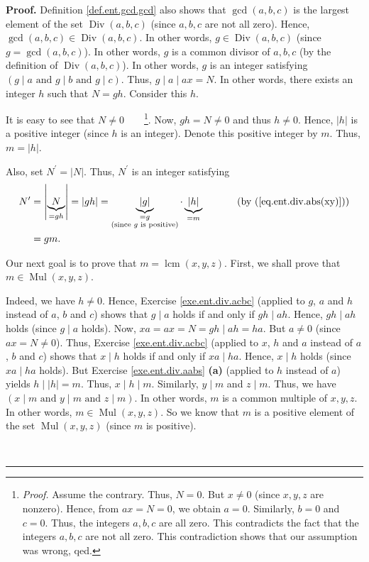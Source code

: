 \documentclass[numbers=enddot,12pt,final,onecolumn,notitlepage]{scrartcl}%
\numberwithin{exer}{subsection}
\theoremstyle{definition}
\newenvironment{fineprint}{\begin{small}}{\end{small}}
\newenvironment{proof}[1][Proof]{\noindent\textbf{#1.} }{\ \rule{0.5em}{0.5em}}
\begin{document}
\begin{fineprint}
\begin{proof}
Definition \ref{def.ent.gcd.gcd} also shows that $\gcd\left(  a,b,c\right)  $
is the largest element of the set $\operatorname*{Div}\left(  a,b,c\right)  $
(since $a,b,c$ are not all zero). Hence, $\gcd\left(  a,b,c\right)
\in\operatorname*{Div}\left(  a,b,c\right)  $. In other words, $g\in
\operatorname*{Div}\left(  a,b,c\right)  $ (since $g=\gcd\left(  a,b,c\right)
$). In other words, $g$ is a common divisor of $a,b,c$ (by the definition of
$\operatorname*{Div}\left(  a,b,c\right)  $). In other words, $g$ is an
integer satisfying $\left(  g\mid a\text{ and }g\mid b\text{ and }g\mid
c\right)  $. Thus, $g\mid a\mid ax=N$. In other words, there exists an integer
$h$ such that $N=gh$. Consider this $h$.

It is easy to see that $N\neq0$\ \ \ \ \footnote{\textit{Proof.} Assume the
contrary. Thus, $N=0$. But $x\neq0$ (since $x,y,z$ are nonzero). Hence, from
$ax=N=0$, we obtain $a=0$. Similarly, $b=0$ and $c=0$. Thus, the integers
$a,b,c$ are all zero. This contradicts the fact that the integers $a,b,c$ are
not all zero. This contradiction shows that our assumption was wrong, qed.}.
Now, $gh=N\neq0$ and thus $h\neq0$. Hence, $\left\vert h\right\vert $ is a
positive integer (since $h$ is an integer). Denote this positive integer by
$m$. Thus, $m=\left\vert h\right\vert $.

Also, set $N^{\prime}=\left\vert N\right\vert $. Thus, $N^{\prime}$ is an
integer satisfying%
\begin{align}
N^{\prime}  &  =\left\vert \underbrace{N}_{=gh}\right\vert =\left\vert
gh\right\vert =\underbrace{\left\vert g\right\vert }%
_{\substack{=g\\\text{(since }g\text{ is positive)}}}\cdot
\underbrace{\left\vert h\right\vert }_{=m}\ \ \ \ \ \ \ \ \ \ \left(  \text{by
(\ref{eq.ent.div.abs(xy)})}\right) \nonumber\\
&  =gm. \label{sol.ent.lcm.lcmabc.c1.pf.3}%
\end{align}


Our next goal is to prove that $m=\operatorname{lcm}\left(  x,y,z\right)  $.
First, we shall prove that $m\in\operatorname*{Mul}\left(  x,y,z\right)  $.

Indeed, we have $h\neq0$. Hence, Exercise \ref{exe.ent.div.acbc} (applied to
$g$, $a$ and $h$ instead of $a$, $b$ and $c$) shows that $g\mid a$ holds if
and only if $gh\mid ah$. Hence, $gh\mid ah$ holds (since $g\mid a$ holds).
Now, $xa=ax=N=gh\mid ah=ha$. But $a\neq0$ (since $ax=N\neq0$). Thus, Exercise
\ref{exe.ent.div.acbc} (applied to $x$, $h$ and $a$ instead of $a$, $b$ and
$c$) shows that $x\mid h$ holds if and only if $xa\mid ha$. Hence, $x\mid h$
holds (since $xa\mid ha$ holds). But Exercise \ref{exe.ent.div.aabs}
\textbf{(a)} (applied to $h$ instead of $a$) yields $h\mid\left\vert
h\right\vert =m$. Thus, $x\mid h\mid m$. Similarly, $y\mid m$ and $z\mid m$.
Thus, we have $\left(  x\mid m\text{ and }y\mid m\text{ and }z\mid m\right)
$. In other words, $m$ is a common multiple of $x,y,z$. In other words,
$m\in\operatorname*{Mul}\left(  x,y,z\right)  $. So we know that $m$ is a
positive element of the set $\operatorname*{Mul}\left(  x,y,z\right)  $ (since
$m$ is positive).


\end{proof}
\end{fineprint}
\end{document}
